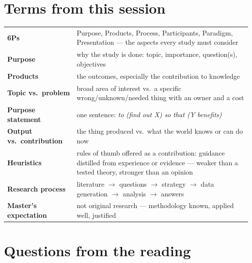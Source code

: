 \documentclass[11pt,a4paper,british,twoside=false,headings=small,chapterprefix=false,numbers=noenddot]{scrbook}
\begin{document}
\section*{Terms from this session}
\begin{center}\small
\footnotesize
  \renewcommand{\arraystretch}{1.2}
  \begin{tabular}{@{}p{3.4cm}p{10.1cm}@{}}
    \toprule
    \textbf{6Ps} & Purpose, Products, Process, Participants, Paradigm, Presentation --- the aspects every study must consider\\
    \textbf{Purpose} & why the study is done: topic, importance, question(s), objectives\\
    \textbf{Products} & the outcomes, especially the contribution to knowledge\\
    \textbf{Topic vs.\ problem} & broad area of interest vs.\ a specific wrong/unknown/needed thing with an owner and a cost\\
    \textbf{Purpose statement} & one sentence: \emph{to (find out X) so that (Y benefits)}\\
    \textbf{Output vs.\ contribution} & the thing produced vs.\ what the world knows or can do now\\
    \textbf{Heuristics} & rules of thumb offered as a contribution: guidance distilled from experience or evidence --- weaker than a tested theory, stronger than an opinion\\
    \textbf{Research process} & literature $\rightarrow$ questions $\rightarrow$ strategy $\rightarrow$ data generation $\rightarrow$ analysis $\rightarrow$ answers\\
    \textbf{Master's expectation} & not original research --- methodology known, applied well, justified\\
    \bottomrule
  \end{tabular}
\end{center}



\section*{Questions from the reading}
\end{document}
